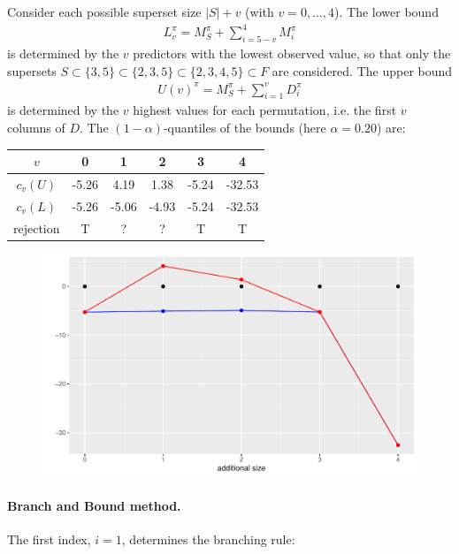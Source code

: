 \documentclass[11pt,a4paper,openright,twoside]{article}
\begin{document}
Consider each possible superset size $|S|+v$ (with $v=0,\ldots,4$). The lower bound 
\begin{align*}
L_v^\pi=M_S^\pi + \sum_{i=5-v}^{4} M_i^\pi
\end{align*}
is determined by the $v$ predictors with the lowest observed value, so that only the supersets $S\subset \{3,5\}\subset\{2,3,5\}\subset\{2,3,4,5\}\subset F$ are considered. The upper bound
\begin{align*}
U(v)^\pi=M_S^\pi + \sum_{i=1}^v D_i^\pi
\end{align*}
is determined by the $v$ highest values for each permutation, i.e. the first $v$ columns of $D$. The $(1-\alpha)$-quantiles of the bounds (here $\alpha=0.20$) are:
\begin{table}[h!]
\centering
\begin{tabular}{cccccc}
\toprule
$v$ & 0 & 1 & 2 & 3 & 4\\
\midrule
$c_v(U)$ & -5.26 & 4.19 & 1.38 & -5.24 & -32.53\\
$c_v(L)$ & -5.26 & -5.06 & -4.93 & -5.24 & -32.53\\
\midrule
rejection & T & ? & ? & T & T\\
\bottomrule
\end{tabular}
\end{table}

\begin{figure}[h!]
\centering
\includegraphics[scale=0.6]{plot1.pdf}
\end{figure}



\newpage
\paragraph{Branch and Bound method.} The first index, $i=1$, determines the branching rule:
\end{document}
